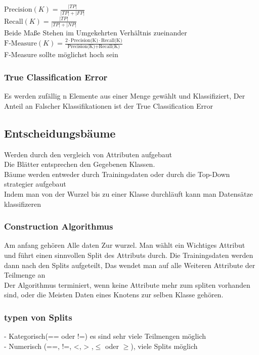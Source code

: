 \documentclass[a4paper]{scrartcl}
\begin{document}
$\text{Precision}(K)=\frac{|TP|}{|TP|+|FP|}$\\
$\text{Recall}(K)=\frac{|TP|}{|TP|+|NP|}$\\

Beide Maße Stehen im Umgekehrten Verhältnis zueinander\\

$\text{F-Measure}(K)=\frac{2\cdot \text{Precision(K)}\cdot \text{Recall(K)}}{\text{Precision(K)}+\text{Recall(K)}}$\\
F-Measure sollte möglichst hoch sein\\

\subsubsection{True Classification Error}
Es werden zufällig n Elemente aus einer Menge gewählt und Klassifiziert, Der Anteil an Falscher Klassifikationen ist der True Classification Error\\
\subsection{Entscheidungsbäume}

Werden durch den vergleich von Attributen aufgebaut\\
Die Blätter entsprechen den Gegebenen Klassen.\\

Bäume werden entweder durch Trainingsdaten oder durch die Top-Down strategier aufgebaut\\

Indem man von der Wurzel bis zu einer Klasse durchläuft kann man Datensätze klassifizeren\\

\subsubsection{Construction Algorithmus}
Am anfang gehören Alle daten Zur wurzel. Man wählt ein Wichtiges Attribut und führt einen sinnvollen Split des Attributs durch. Die Trainingsdaten werden dann nach den Splits aufgeteilt, Das wendet man auf alle Weiteren Attribute der Teilmenge an\\

Der Algorithmus terminiert, wenn keine Attribute mehr zum spliten vorhanden sind, oder die Meisten Daten eines Knotens zur selben Klasse gehören.

\subsubsection{typen von Splits}
- Kategorisch(== oder !=) es sind sehr viele Teilmengen möglich\\
- Numerisch (==, !=, <, > ,$\leq$ oder $\geq$), viele Splits möglich\\
\end{document}

